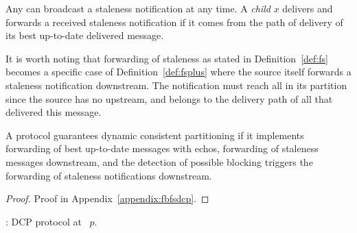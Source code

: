 \begin{definition} Any \emph{\process} can broadcast a
  staleness notification at any time. A \emph{child \process} $x$
  delivers and forwards a received staleness notification if it comes
  from the path of delivery of its best up-to-date delivered
  message.
\end{definition}

It is worth noting that forwarding of staleness as stated in
Definition~\ref{def:fs} becomes a specific case of
Definition~\ref{def:fsplus} where the source itself forwards a
staleness notification downstream. The notification must reach all
\processes in its partition since the source has no \processes
upstream, and belongs to the delivery path of all \processes that
delivered this message.

\begin{theorem}
  A protocol guarantees dynamic consistent partitioning if it
  implements forwarding of best up-to-date messages with echos,
  forwarding of staleness messages downstream, and the detection of
  possible blocking triggers the forwarding of staleness notifications
  downstream.
\end{theorem}

\begin{proof}
  Proof in Appendix~\ref{appendix:fbfsdcp}.
\end{proof}

\begin{algorithm}[t]
  
  \caption{\label{algo:ascast}\NAME: DCP protocol at \Process~$p$.}
\end{algorithm}

